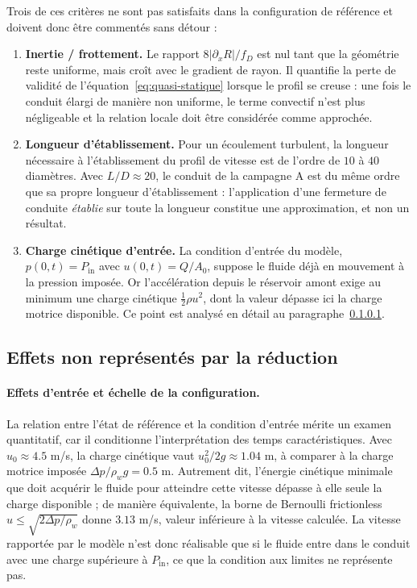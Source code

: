 \documentclass[11pt,a4paper]{report}
\begin{document}
Trois de ces critères ne sont pas satisfaits dans la configuration de référence et doivent donc être
commentés sans détour :
\begin{enumerate}
  \item \textbf{Inertie / frottement.} Le rapport \(8|\partial_x R|/f_D\) est nul tant que la géométrie
        reste uniforme, mais croît avec le gradient de rayon. Il quantifie la perte de validité de
        l'équation~\eqref{eq:quasi-statique} lorsque le profil se creuse : une fois le conduit élargi de
        manière non uniforme, le terme convectif n'est plus négligeable et la relation locale doit être
        considérée comme approchée.
  \item \textbf{Longueur d'établissement.} Pour un écoulement turbulent, la longueur nécessaire à
        l'établissement du profil de vitesse est de l'ordre de \(10\) à \(40\) diamètres. Avec
        \(L/D \approx 20\), le conduit de la campagne A est du même ordre que sa propre longueur
        d'établissement : l'application d'une fermeture de conduite \emph{établie} sur toute la
        longueur constitue une approximation, et non un résultat.
  \item \textbf{Charge cinétique d'entrée.} La condition d'entrée du modèle, \(p(0,t) = P_{\mathrm{in}}\)
        avec \(u(0,t) = Q/A_0\), suppose le fluide déjà en mouvement à la pression imposée. Or
        l'accélération depuis le réservoir amont exige au minimum une charge cinétique
        \(\frac{1}{2}\rho u^2\), dont la valeur dépasse ici la charge motrice disponible. Ce point est
        analysé en détail au paragraphe~\ref{par:entree}.
\end{enumerate}

\subsection{Effets non représentés par la réduction}
\label{sec:effets-non-representes}

\paragraph{Effets d'entrée et échelle de la configuration.}
\label{par:entree}
La relation entre l'état de référence et la condition d'entrée mérite un examen quantitatif, car il
conditionne l'interprétation des temps caractéristiques. Avec \(u_0 \approx 4.5\) m/s, la charge
cinétique vaut \(u_0^2/2g \approx 1.04\) m, à comparer à la charge motrice imposée \(\Delta p/\rho_w g =
0.5\) m. Autrement dit, l'énergie cinétique minimale que doit acquérir le fluide pour atteindre cette
vitesse dépasse à elle seule la charge disponible ; de manière équivalente, la borne de Bernoulli
frictionless \(u \le \sqrt{2\Delta p/\rho_w}\) donne \(3.13\) m/s, valeur inférieure à la vitesse
calculée. La vitesse rapportée par le modèle n'est donc réalisable que si le fluide entre dans le conduit
avec une charge supérieure à \(P_{\mathrm{in}}\), ce que la condition aux limites ne représente pas.
\end{document}

